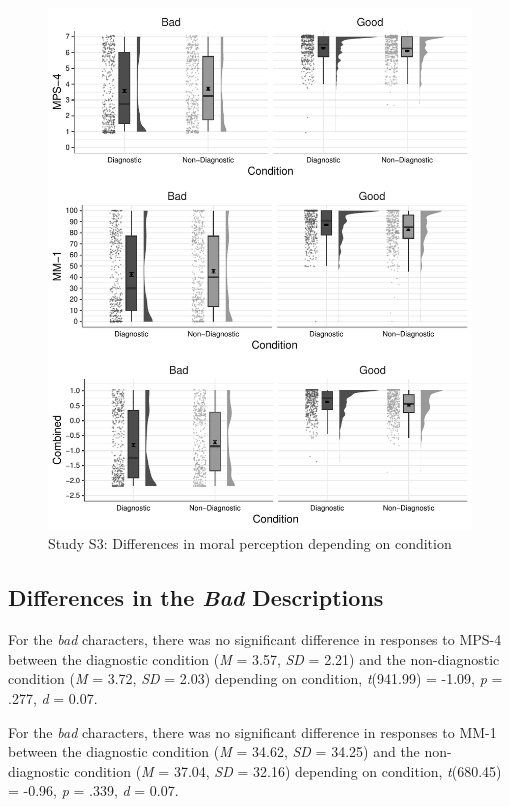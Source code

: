 \documentclass[
  man,floatsintext]{apa6}
\begin{document}
\begin{figure}[!h]
\includegraphics[width=\textwidth,]{Supplementary_files/figure-latex/StudyS3bothconditionplot-1} \caption{Study S3: Differences in moral perception depending on condition}\label{fig:StudyS3bothconditionplot}
\end{figure}

\subsection{\texorpdfstring{Differences in the \emph{Bad} Descriptions}{Differences in the Bad Descriptions}}\label{differences-in-the-bad-descriptions-1}

For the \emph{bad} characters, there was no significant difference in responses to MPS-4 between the diagnostic condition (\emph{M} = 3.57, \emph{SD} = 2.21) and the non-diagnostic condition (\emph{M} = 3.72, \emph{SD} = 2.03) depending on condition, \emph{t}(941.99) = -1.09, \emph{p} = .277, \emph{d} = 0.07.

For the \emph{bad} characters, there was no significant difference in responses to MM-1 between the diagnostic condition (\emph{M} = 34.62, \emph{SD} = 34.25) and the non-diagnostic condition (\emph{M} = 37.04, \emph{SD} = 32.16) depending on condition, \emph{t}(680.45) = -0.96, \emph{p} = .339, \emph{d} = 0.07.
\end{document}
